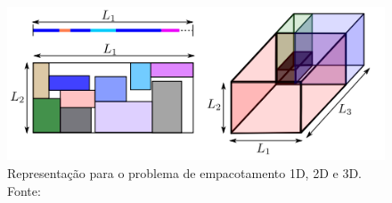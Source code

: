 \begin{figure}[!htb]
    \centering
    \includegraphics[scale=1]{utils/images/packing-example}
    \caption{Representação para o problema de empacotamento 1D, 2D e 3D. Fonte:\cite{castellucci2019consolidation}}
    \label{fig:packing-example}
\end{figure}
